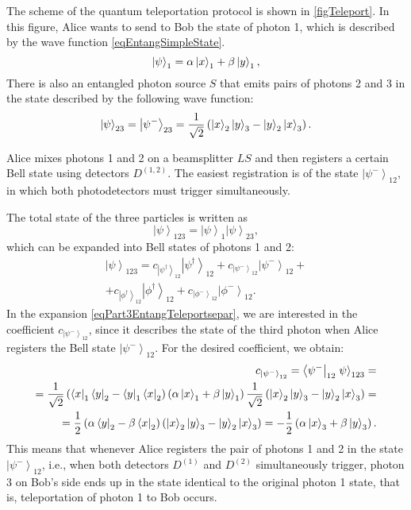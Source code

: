 

The scheme of the quantum teleportation protocol is shown in \autoref{figTeleport}. In this figure, Alice wants to send to Bob the state of photon 1, which is described by the wave function \eqref{eqEntangSimpleState}. 
\[
\left|\psi\right>_1 = \alpha \ket{x}_1 +
\beta \ket{y}_1, 
\]
 There is also an entangled photon source $S$ that emits pairs of photons 2 and 3 in the state described by the following wave function:
\begin{equation}
  \left|\psi\right>_{23} = \left|\psi^{-}\right>_{23} = \frac{1}{\sqrt{2}}\left(
  \ket{x}_2\ket{y}_3 - 
  \ket{y}_2\ket{x}_3
  \right).
  \nonumber
\end{equation}

Alice mixes photons 1 and 2 on a beamsplitter $LS$ and then registers a certain Bell state using detectors $D^{(1,2)}$. The easiest registration is of the state $\left|\psi^{-}\right>_{12}$, in which both photodetectors must trigger simultaneously.

The total state of the three particles is written as
\begin{equation}
  \left|\psi\right>_{123} = \left|\psi\right>_1 \left|\psi\right>_{23},
  \nonumber
\end{equation}
which can be expanded into Bell states of photons 1 and 2:
\begin{eqnarray}
\left|\psi\right>_{123} = 
c_{\left|\psi^{\dag}\right>_{12}}\left|\psi^{\dag}\right>_{12} +
c_{\left|\psi^{-}\right>_{12}}\left|\psi^{-}\right>_{12} +
\nonumber \\
+
c_{\left|\phi^{\dag}\right>_{12}}\left|\phi^{\dag}\right>_{12} +
c_{\left|\phi^{-}\right>_{12}}\left|\phi^{-}\right>_{12}.
\label{eqPart3EntangTeleportsepar}
\end{eqnarray}
In the expansion \eqref{eqPart3EntangTeleportsepar}, we are interested in the coefficient 
$c_{\left|\psi^{-}\right>_{12}}$, since it describes 
the state of the third photon when Alice registers the Bell state 
$\left|\psi^{-}\right>_{12}$. For the desired coefficient, we obtain:
\begin{eqnarray}
  c_{\left|\psi^{-}\right>_{12}} = 
  \left<\psi^{-}\right|_{12} \left.\psi\right>_{123} = 
  \nonumber \\
  =
  \frac{1}{\sqrt{2}}
  \left(
  \bra{x}_1\bra{y}_2 - 
  \bra{y}_1\bra{x}_2
  \right)
  \left(
  \alpha \ket{x}_1 +
  \beta \ket{y}_1
  \right)
  \frac{1}{\sqrt{2}}
  \left(
  \ket{x}_2\ket{y}_3 - 
  \ket{y}_2\ket{x}_3
  \right) = 
  \nonumber \\
  = \frac{1}{2}
  \left(
  \alpha\bra{y}_2 - 
  \beta\bra{x}_2
  \right)
  \left(
  \ket{x}_2\ket{y}_3 - 
  \ket{y}_2\ket{x}_3
  \right) = 
  - \frac{1}{2}  
  \left(
  \alpha \ket{x}_3 +
  \beta \ket{y}_3
  \right).
\nonumber
\end{eqnarray}
This means that whenever Alice registers the pair of photons 1 and 2 
in the state $\left|\psi^{-}\right>_{12}$, i.e., when both detectors
$D^{(1)}$ and $D^{(2)}$ simultaneously trigger, photon 3 on Bob's side ends up in the state identical to the original photon 1 state,
that is, teleportation of photon 1 to Bob occurs.

